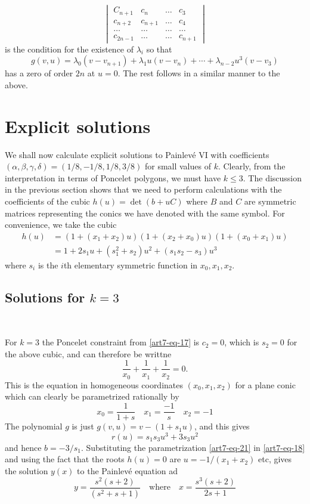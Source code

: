 $$
\begin{vmatrix}
C_{n+1} & c_{n} & \ldots  & c_{3}\\
c_{n+2} & c_{n+1} & \ldots & c_{4}\\
\ldots & \ldots & \ldots & \ldots\\
c_{2n-1} & \ldots &\ldots & c_{n+1}
\end{vmatrix}
$$
is the condition for the existence of $\lambda_{i}$ so that
$$
g(v,u) =\lambda_{0}(v-v_{n+1}) + \lambda_{1}u(v-v_{n}) + \cdots+\lambda_{n-2}u^{3}(v-v_{3})
$$
has a zero of order $2n$ at $u=0$. The rest follows in a similar manner to the above.

\section{Explicit solutions}\label{art7-sec-6}

We shall now calculate explicit solutions to Painlev\'e VI with coefficients $(\alpha,\beta, \gamma, \delta)=(1/8,-1/8,1/8,3/8)$ for small values of $k$. Clearly, from the interpretation in terms of Poncelet polygons, we must have $k\leq 3$. The discussion in the previous section shows that we need to perform calculations with the coefficients of the cubic $h(u)=\det(b+uC)$ where $B$ and $C$ are symmetric matrices representing the conics we have denoted with the same symbol. For convenience, we take the cubic
\begin{align*}\label{art7-eq-20}
h(u) &=(1+(x_{1}+x_{2})u)(1+(x_{2}+x_{0})u)(1+(x_{0}+x_{1})u)\nonumber\\
     &=1+2s_{1}u + (s_{1}^{2}+s_{2})u^{2} +(s_{1}s_{2}-s_{3})u^{3}\tag{20}
\end{align*}
where $s_{i}$ is the $i$th elementary symmetric function in $x_{0}, x_{1},x_{2}$. 

\subsection{Solutions for \boldmath$k=3$}\label{art7-subsec-6.1}
~\pageoriginale

\smallskip
\noindent
For $k=3$ the Poncelet constraint from \eqref{art7-eq-17} is $c_{2}=0$, which is $s_{2}=0$ for the above cubic, and can therefore be writtne
$$
\dfrac{1}{x_{0}}+\dfrac{1}{x_{1}} +\dfrac{1}{x_{2}}=0.
$$
This is the equation in homogeneous coordinates $(x_{0}, x_{1},x_{2})$ for a plane conic which can clearly be parametrized rationally by
\begin{equation*}\label{art7-eq-21}
x_{0}=\dfrac{1}{1+s} \quad x_{1}=\dfrac{-1}{s} \quad x_{2}=-1\tag{21}
\end{equation*}
The polynomial $g$ is just $g(v,u) = v-(1+s_{1}u)$, and this gives
$$
r(u)=s_{1}s_{3}u^{3} +3s_{3}u^{2}
$$
and hence $b=-3/s_{1}$. Substituting the parametrization \eqref{art7-eq-21} in \eqref{art7-eq-18} and using the fact that the roots $h(u)=0$ are $u =-1/(x_{1}+x_{2})$ etc, gives the solution $y(x)$ to the Painlev\'e equation ad
$$
y = \dfrac{s^{2}(s+2)}{(s^{2}+s+1)} \quad \text{where} \quad x=\dfrac{s^{3}(s+2)}{2s+1}
$$

